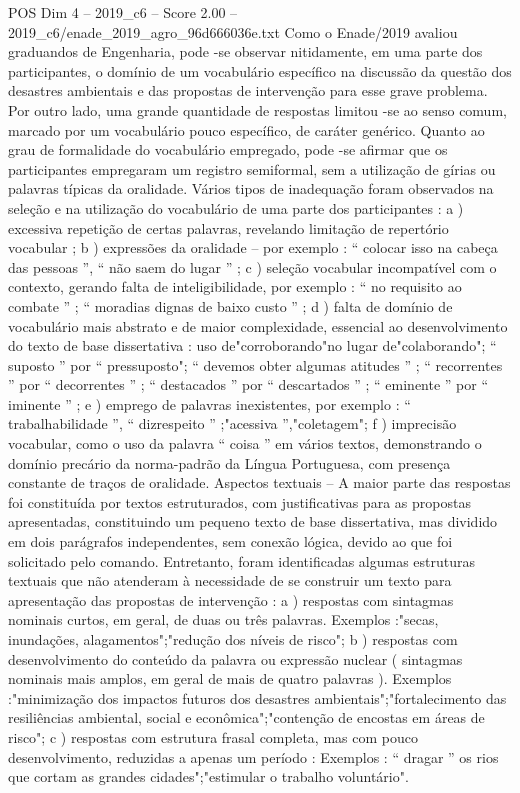 \begin{textsample}{POS Dim 4 – 2019\_c6 – Score 2.00 – 2019\_c6/enade\_2019\_agro\_96d666036e.txt}
Como o Enade/2019 avaliou graduandos de Engenharia, pode -se observar nitidamente, em uma parte dos participantes, o domínio de um vocabulário específico na discussão da questão dos desastres ambientais e das propostas de intervenção para esse grave problema.
Por outro lado, uma grande quantidade de respostas limitou -se ao senso comum, marcado por um vocabulário pouco específico, de caráter genérico.
Quanto ao grau de formalidade do vocabulário empregado, pode -se afirmar que os participantes empregaram um registro semiformal, sem a utilização de gírias ou palavras típicas da oralidade.
Vários tipos de inadequação foram observados na seleção e na utilização do vocabulário de uma parte dos participantes : a ) excessiva repetição de certas palavras, revelando limitação de repertório vocabular ; b ) expressões da oralidade – por exemplo : “ colocar isso na cabeça das pessoas ”, “ não saem do lugar ” ; c ) seleção vocabular incompatível com o contexto, gerando falta de inteligibilidade, por exemplo : “ no requisito ao combate ” ; “ moradias dignas de baixo custo ” ; d ) falta de domínio de vocabulário mais abstrato e de maior complexidade, essencial ao desenvolvimento do texto de base dissertativa : uso de"corroborando"no lugar de"colaborando"; “ suposto ” por “ pressuposto"; “ devemos obter algumas atitudes ” ; “ recorrentes ” por “ decorrentes ” ; “ destacados ” por “ descartados ” ; “ eminente ” por “ iminente ” ; e ) emprego de palavras inexistentes, por exemplo : “ trabalhabilidade ”, “ dizrespeito ” ;"acessiva ”,"coletagem"; f ) imprecisão vocabular, como o uso da palavra “ coisa ” em vários textos, demonstrando o domínio precário da norma-padrão da Língua Portuguesa, com presença constante de traços de oralidade.
Aspectos textuais – A maior parte das respostas foi constituída por textos estruturados, com justificativas para as propostas apresentadas, constituindo um pequeno texto de base dissertativa, mas dividido em dois parágrafos independentes, sem conexão lógica, devido ao que foi solicitado pelo comando.
Entretanto, foram identificadas algumas estruturas textuais que não atenderam à necessidade de se construir um texto para apresentação das propostas de intervenção : a ) respostas com sintagmas nominais curtos, em geral, de duas ou três palavras.
Exemplos :"secas, inundações, alagamentos";"redução dos níveis de risco"; b ) respostas com desenvolvimento do conteúdo da palavra ou expressão nuclear ( sintagmas nominais mais amplos, em geral de mais de quatro palavras ).
Exemplos :"minimização dos impactos futuros dos desastres ambientais";"fortalecimento das resiliências ambiental, social e econômica";"contenção de encostas em áreas de risco"; c ) respostas com estrutura frasal completa, mas com pouco desenvolvimento, reduzidas a apenas um período : Exemplos : “ dragar ” os rios que cortam as grandes cidades";"estimular o trabalho voluntário".

\end{textsample}
